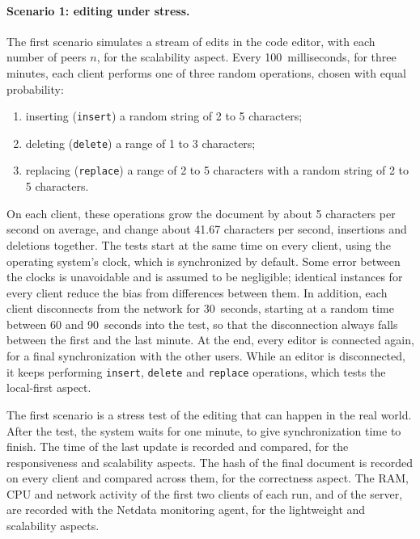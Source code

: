 \paragraph{Scenario 1: editing under stress.} The first scenario simulates a stream of edits in the code editor, with each number of peers $n$, for the scalability aspect. Every 100~milliseconds, for three minutes, each client performs one of three random operations, chosen with equal probability:

\begin{enumerate}
    \item inserting (\texttt{insert}) a random string of 2 to 5 characters;
    \item deleting (\texttt{delete}) a range of 1 to 3 characters;
    \item replacing (\texttt{replace}) a range of 2 to 5 characters with a random string of 2 to 5 characters.
\end{enumerate}

On each client, these operations grow the document by about 5 characters per second on average, and change about 41.67 characters per second, insertions and deletions together. The tests start at the same time on every client, using the operating system's clock, which is synchronized by default. Some error between the clocks is unavoidable and is assumed to be negligible; identical instances for every client reduce the bias from differences between them. In addition, each client disconnects from the network for 30~seconds, starting at a random time between 60 and 90~seconds into the test, so that the disconnection always falls between the first and the last minute. At the end, every editor is connected again, for a final synchronization with the other users. While an editor is disconnected, it keeps performing \texttt{insert}, \texttt{delete} and \texttt{replace} operations, which tests the local-first aspect.

The first scenario is a stress test of the editing that can happen in the real world. After the test, the system waits for one minute, to give synchronization time to finish. The time of the last update is recorded and compared, for the responsiveness and scalability aspects. The hash of the final document is recorded on every client and compared across them, for the correctness aspect. The RAM, CPU and network activity of the first two clients of each run, and of the server, are recorded with the Netdata monitoring agent, for the lightweight and scalability aspects.

